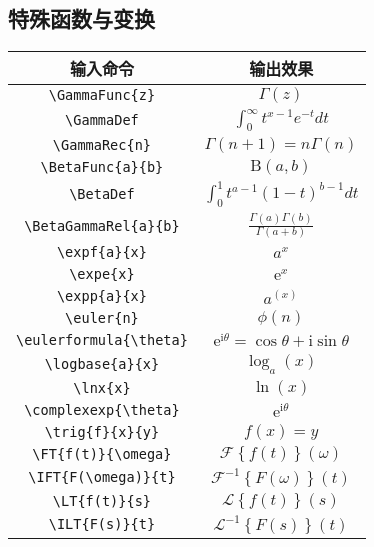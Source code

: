 \documentclass[12pt,a4paper]{ctexart}
\newcommand{\GammaFunc}[1]{\Gamma(#1)}       %
\newcommand{\GammaDef}{\int_0^\infty t^{x-1}e^{-t}dt}  %
\newcommand{\GammaRec}[1]{\Gamma(#1+1) = #1\Gamma(#1)} %
\newcommand{\BetaFunc}[2]{\mathrm{B}(#1,#2)}  %
\newcommand{\BetaDef}{\int_0^1 t^{a-1}(1-t)^{b-1}dt}  %
\newcommand{\BetaGammaRel}[2]{\frac{\GammaFunc{#1}\GammaFunc{#2}}{\GammaFunc{#1+#2}}} %
\newcommand{\expf}[2]{#1^{#2}}  %
\newcommand{\expe}[1]{\mathrm{e}^{#1}}  %
\newcommand{\expp}[2]{#1^{\left( #2 \right)}}  %
\newcommand{\euler}[1]{\phi\left( #1 \right)}  %
\newcommand{\eulerformula}[1]{\mathrm{e}^{\mathrm{i}#1} = \cos#1 + \mathrm{i}\sin#1}
\newcommand{\logbase}[2]{\log_{#1}\left( #2 \right)}  %
\newcommand{\lnx}[1]{\ln\left( #1 \right)}  %
\newcommand{\complexexp}[1]{\mathrm{e}^{\mathrm{i}#1}}  %
\newcommand{\trig}[3]{#1\left( #2 \right) = #3}  %
\newcommand{\FT}[2]{\mathcal{F}\left\{#1\right\}(#2)}
\newcommand{\IFT}[2]{\mathcal{F}^{-1}\left\{#1\right\}(#2)}
\newcommand{\LT}[2]{\mathcal{L}\left\{#1\right\}(#2)}
\newcommand{\ILT}[2]{\mathcal{L}^{-1}\left\{#1\right\}(#2)}
\begin{document}
\subsection*{特殊函数与变换}
\begin{center}
	\begin{tabular}{|c|c|}
		\hline
		输入命令 & 输出效果 \\
		\hline
		\verb|\GammaFunc{z}| & $\GammaFunc{z}$ \\
		\verb|\GammaDef| & $\GammaDef$ \\
		\verb|\GammaRec{n}| & $\GammaRec{n}$ \\
		\verb|\BetaFunc{a}{b}| & $\BetaFunc{a}{b}$ \\
		\verb|\BetaDef| & $\BetaDef$ \\
		\verb|\BetaGammaRel{a}{b}| & $\BetaGammaRel{a}{b}$ \\
		\verb|\expf{a}{x}| & $\expf{a}{x}$ \\
		\verb|\expe{x}| & $\expe{x}$ \\
		\verb|\expp{a}{x}| & $\expp{a}{x}$ \\
		\verb|\euler{n}| & $\euler{n}$ \\
		\verb|\eulerformula{\theta}| & $\eulerformula{\theta}$ \\
		\verb|\logbase{a}{x}| & $\logbase{a}{x}$ \\
		\verb|\lnx{x}| & $\lnx{x}$ \\
		\verb|\complexexp{\theta}| & $\complexexp{\theta}$ \\
		\verb|\trig{f}{x}{y}| & $\trig{f}{x}{y}$ \\
		\verb|\FT{f(t)}{\omega}| & $\FT{f(t)}{\omega}$ \\
		\verb|\IFT{F(\omega)}{t}| & $\IFT{F(\omega)}{t}$ \\
		\verb|\LT{f(t)}{s}| & $\LT{f(t)}{s}$ \\
		\verb|\ILT{F(s)}{t}| & $\ILT{F(s)}{t}$ \\
		\hline
	\end{tabular}
\end{center}
\end{document}
